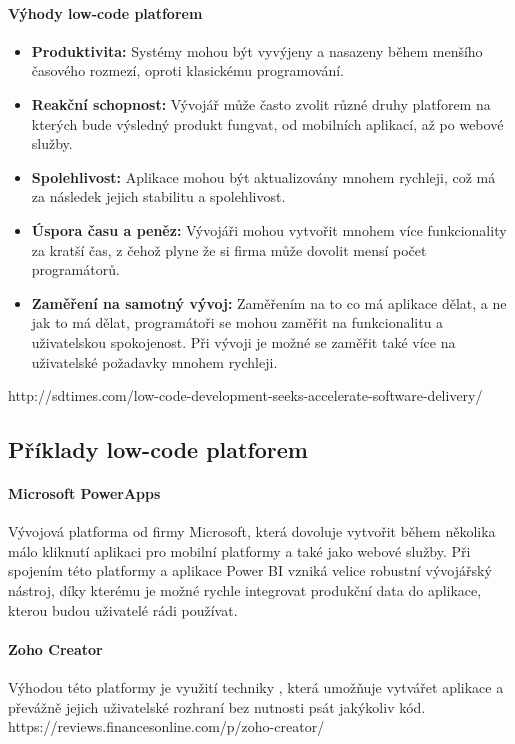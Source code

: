 \paragraph{Výhody low-code platforem}
\begin{itemize}
  \item \textbf{Produktivita:} Systémy mohou být vyvýjeny a nasazeny během menšího časového rozmezí, oproti klasickému programování.
  \item \textbf{Reakční schopnost:} Vývojář může často zvolit různé druhy platforem na kterých bude výsledný produkt fungvat, od mobilních aplikací, až po webové služby.
  \item \textbf{Spolehlivost:} Aplikace mohou být aktualizovány mnohem rychleji, což má za následek jejich stabilitu a spolehlivost.
  \item \textbf{Úspora času a peněz:} Vývojáři mohou vytvořit mnohem více funkcionality za kratší čas, z čehož plyne že si firma může dovolit mensí počet programátorů.
  \item \textbf{Zaměření na samotný vývoj:} Zaměřením na to co má aplikace dělat, a ne jak to má dělat, programátoři se mohou zaměřit na funkcionalitu a uživatelskou spokojenost. Při vývoji je možné se zaměřit také více na uživatelské požadavky mnohem rychleji.
\end{itemize}
http://sdtimes.com/low-code-development-seeks-accelerate-software-delivery/

\subsection{Příklady low-code platforem}
\paragraph{Microsoft PowerApps} Vývojová platforma od firmy Microsoft, která dovoluje vytvořit během několika málo kliknutí aplikaci pro mobilní platformy a také jako webové služby. Při spojením této platformy a aplikace Power BI vzniká velice robustní vývojářský nástroj, díky kterému je možné rychle integrovat produkční data do aplikace, kterou budou uživatelé rádi používat.
\paragraph{Zoho Creator} Výhodou této platformy je využití techniky , která umožňuje vytvářet aplikace a převážně jejich uživatelské rozhraní bez nutnosti psát jakýkoliv kód. https://reviews.financesonline.com/p/zoho-creator/
